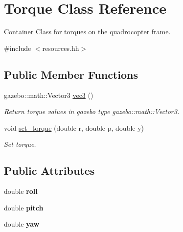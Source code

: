 \hypertarget{classTorque}{\section{\-Torque \-Class \-Reference}
\label{classTorque}
}


\-Container \-Class for torques on the quadrocopter frame.  




{\ttfamily \#include $<$resources.\-hh$>$}

\subsection*{\-Public \-Member \-Functions}
\begin{DoxyCompactItemize}
\item 
\hypertarget{classTorque_adab996768b7f4f78f489fed1ae256930}{gazebo\-::math\-::\-Vector3 \hyperlink{classTorque_adab996768b7f4f78f489fed1ae256930}{vec3} ()}\label{classTorque_adab996768b7f4f78f489fed1ae256930}

\begin{DoxyCompactList}\small\item\em \-Return torque values in gazebo type gazebo\-::math\-::\-Vector3. \end{DoxyCompactList}\item 
void \hyperlink{classTorque_a15f19c1be7744f4cb2de141a60f2b8d5}{set\-\_\-torque} (double r, double p, double y)
\begin{DoxyCompactList}\small\item\em \-Set torque. \end{DoxyCompactList}\end{DoxyCompactItemize}
\subsection*{\-Public \-Attributes}
\begin{DoxyCompactItemize}
\item 
\hypertarget{classTorque_a64b4e9ef32f9ca60fa5902a4bb3b3bc0}{double {\bfseries roll}}\label{classTorque_a64b4e9ef32f9ca60fa5902a4bb3b3bc0}

\item 
\hypertarget{classTorque_a070c7b6cc2709580beb1dcfd49ac5886}{double {\bfseries pitch}}\label{classTorque_a070c7b6cc2709580beb1dcfd49ac5886}

\item 
\hypertarget{classTorque_a960a9d0e47dfdca04359994daf0dea33}{double {\bfseries yaw}}\label{classTorque_a960a9d0e47dfdca04359994daf0dea33}

\end{DoxyCompactItemize}
